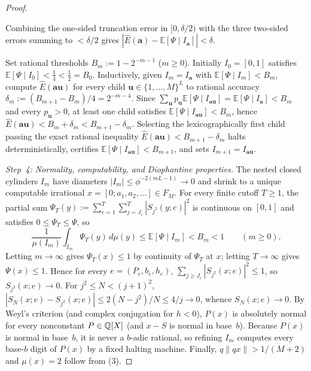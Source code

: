 \documentclass[11pt]{article}
\newcommand{\dist}[1]{\lVert #1\rVert}
\newcommand{\Ex}{\mathbb{E}}
\begin{document}
\begin{proof}
\begin{enumerate}[label=\textup{(\alph*)},nosep]
\end{enumerate}
Combining the one-sided truncation error in $[0,\delta/2)$ with the three two-sided errors summing to $<\delta/2$ gives $|\widehat E(\mathbf{a})-\Ex[\Psi\mid I_{\mathbf{a}}]|<\delta$.

Set rational thresholds $B_m:=1-2^{-m-1}$ ($m\ge0$). Initially $I_0=[0,1]$ satisfies $\Ex[\Psi\mid I_0]<\frac14<\frac12=B_0$. Inductively, given $I_m=I_{\mathbf{a}}$ with $\Ex[\Psi\mid I_m]<B_m$, compute $\widehat E(\mathbf{a}\mathbf{u})$ for every child $\mathbf{u}\in\{1,\dots,M\}^L$ to rational accuracy $\delta_m:=(B_{m+1}-B_m)/4=2^{-m-4}$. Since $\sum_{\mathbf{u}}p_{\mathbf{u}}\Ex[\Psi\mid I_{\mathbf{a}\mathbf{u}}]=\Ex[\Psi\mid I_{\mathbf{a}}]<B_m$ and every $p_{\mathbf{u}}>0$, at least one child satisfies $\Ex[\Psi\mid I_{\mathbf{a}\mathbf{u}}]<B_m$, hence $\widehat E(\mathbf{a}\mathbf{u})<B_m+\delta_m<B_{m+1}-\delta_m$. Selecting the lexicographically first child passing the exact rational inequality $\widehat E(\mathbf{a}\mathbf{u})<B_{m+1}-\delta_m$ halts deterministically, certifies $\Ex[\Psi\mid I_{\mathbf{a}\mathbf{u}}]<B_{m+1}$, and sets $I_{m+1}=I_{\mathbf{a}\mathbf{u}}$.

\emph{Step~4: Normality, computability, and Diophantine properties.}
The nested closed cylinders $I_m$ have diameters $|I_m|\le\phi^{-2(mL-1)}\to0$ and shrink to a unique computable irrational $x=[0;a_1,a_2,\dots]\in F_M$. For every finite cutoff $T\ge1$, the partial sum $\Psi_T(y):=\sum_{e=1}^T\sum_{j=J_e}^T|S_{j^2}(y;e)|^2$ is continuous on $[0,1]$ and satisfies $0\le\Psi_T\le\Psi$, so
\[
\frac1{\mu(I_m)}\int_{I_m}\Psi_T(y)\,d\mu(y)\le\Ex[\Psi\mid I_m]<B_m<1\qquad(m\ge0).
\]
Letting $m\to\infty$ gives $\Psi_T(x)\le1$ by continuity of $\Psi_T$ at $x$; letting $T\to\infty$ gives $\Psi(x)\le1$. Hence for every $e=(P_e,b_e,h_e)$, $\sum_{j\ge J_e}|S_{j^2}(x;e)|^2\le1$, so $S_{j^2}(x;e)\to0$. For $j^2\le N<(j+1)^2$, $|S_N(x;e)-S_{j^2}(x;e)|\le 2(N-j^2)/N\le 4/j\to0$, whence $S_N(x;e)\to0$. By Weyl's criterion (and complex conjugation for $h<0$), $P(x)$ is absolutely normal for every nonconstant $P\in\mathbb Q[X]$ (and $x-S$ is normal in base~$b$). Because $P(x)$ is normal in base~$b$, it is never a $b$-adic rational, so refining $I_m$ computes every base-$b$ digit of $P(x)$ by a fixed halting machine. Finally, $q\dist{qx}>1/(M+2)$ and $\mu(x)=2$ follow from (3).
\end{proof}
\end{document}
